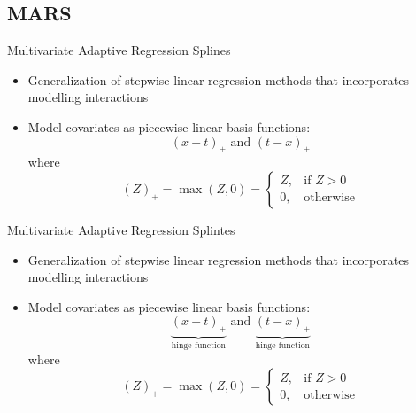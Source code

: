 \documentclass{beamer}
\begin{document}

\subsection{MARS} %
\label{ssub:mars}

\begin{frame}{Multivariate Adaptive Regression Splines}
  \begin{itemize}[<+->]
    \item Generalization of stepwise linear regression methods that incorporates modelling interactions
    \item Model covariates as piecewise linear basis functions:
  \begin{equation*} \label{eq:bases}
    (x - t)_{+} \text{ and } (t - x)_{+}
  \end{equation*} where
  \begin{equation*}
    (Z)_{+} = \max(Z, 0) = \begin{cases}
    Z, & \text{if } Z > 0 \\
    0, & \text{otherwise}
    \end{cases}
  \end{equation*}
  \end{itemize}
\end{frame}

\begin{frame}{Multivariate Adaptive Regression Splintes}
  \begin{itemize}
    \item Generalization of stepwise linear regression methods that incorporates modelling interactions
    \item Model covariates as piecewise linear basis functions:
  \begin{equation*} \label{eq:bases}
    \underbrace{(x - t)_{+}}_\text{hinge function} \text{ and } \underbrace{(t - x)_{+}}_\text{hinge function}
  \end{equation*} where
  \begin{equation*}
    (Z)_{+} = \max(Z, 0) = \begin{cases}
    Z, & \text{if } Z > 0 \\
    0, & \text{otherwise}
    \end{cases}
  \end{equation*}
  \end{itemize}
\end{frame}
\end{document}
